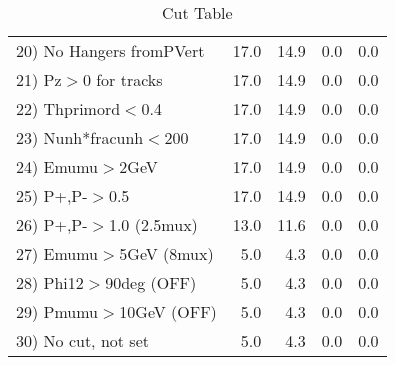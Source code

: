 \begin{table}[h!]
\begin{tabular}{||l||r|r|r|r||}
 20) No Hangers fromPVert &        17.0 &        14.9 &         0.0 &         0.0 \\
 21) Pz$>$0 for tracks    &        17.0 &        14.9 &         0.0 &         0.0 \\
 22) Thprimord$<$0.4      &        17.0 &        14.9 &         0.0 &         0.0 \\
 23) Nunh*fracunh$<$200   &        17.0 &        14.9 &         0.0 &         0.0 \\
 24) Emumu$>$2GeV         &        17.0 &        14.9 &         0.0 &         0.0 \\
 25) P+,P-$>$0.5          &        17.0 &        14.9 &         0.0 &         0.0 \\
 26) P+,P-$>$1.0 (2.5mux) &        13.0 &        11.6 &         0.0 &         0.0 \\
 27) Emumu$>$5GeV  (8mux) &         5.0 &         4.3 &         0.0 &         0.0 \\
 28) Phi12$>$90deg  (OFF) &         5.0 &         4.3 &         0.0 &         0.0 \\
 29) Pmumu$>$10GeV  (OFF) &         5.0 &         4.3 &         0.0 &         0.0 \\
 30) No cut, not set      &         5.0 &         4.3 &         0.0 &         0.0 \\
 \hline
 \hline
 \end{tabular}
 \caption{Cut Table \cohjp  }
 \label{tab-cut__jpsi}
 \end{table}
